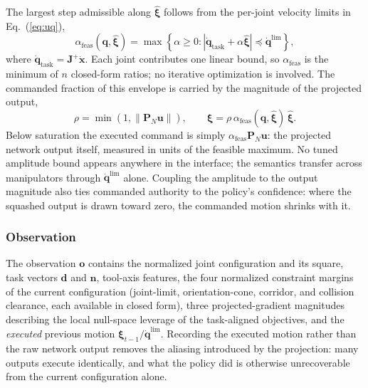 \documentclass[journal, twoside]{IEEEtran}
\begin{document}
The largest step admissible along $\hat{\boldsymbol{\xi}}$ follows from
the per-joint velocity limits in Eq.~(\ref{eq:uq}),
\begin{equation}
\label{eq:alphafeas}
\alpha_{\mathrm{feas}}(\mathbf{q},\hat{\boldsymbol{\xi}})
=
\max
\left\{
\alpha\geq 0:
\left|
\dot{\mathbf{q}}_{\mathrm{task}}+\alpha\hat{\boldsymbol{\xi}}
\right|
\preceq
\dot{\mathbf{q}}^{\lim}
\right\},
\end{equation}
where $\dot{\mathbf{q}}_{\mathrm{task}}=\mathbf{J}^{+}\dot{\mathbf{x}}$.
Each joint contributes one linear bound, so
$\alpha_{\mathrm{feas}}$ is the minimum of $n$ closed-form ratios; no
iterative optimization is involved. The commanded fraction of this
envelope is carried by the magnitude of the projected output,
\begin{equation}
\label{eq:rho}
\rho
=
\min\left(1,\left\|\mathbf{P}_{N}\mathbf{u}\right\|\right),
\qquad
\boldsymbol{\xi}
=
\rho\,
\alpha_{\mathrm{feas}}(\mathbf{q},\hat{\boldsymbol{\xi}})\,
\hat{\boldsymbol{\xi}}.
\end{equation}
Below saturation the executed command is simply
$\alpha_{\mathrm{feas}}\mathbf{P}_{N}\mathbf{u}$: the projected network
output itself, measured in units of the feasible maximum. No tuned
amplitude bound appears anywhere in the interface; the semantics transfer
across manipulators through $\dot{\mathbf{q}}^{\lim}$ alone. Coupling the
amplitude to the output magnitude also ties commanded authority to the
policy's confidence: where the squashed output is drawn toward zero, the
commanded motion shrinks with it.

\subsubsection{Observation}

The observation $\mathbf{o}$ contains the normalized joint configuration
and its square, task vectors $\mathbf{d}$ and $\mathbf{n}$, tool-axis
features, the four normalized constraint margins of the current
configuration (joint-limit, orientation-cone, corridor, and collision
clearance, each available in closed form), three projected-gradient
magnitudes describing the local null-space leverage of the task-aligned
objectives, and the \emph{executed} previous motion
$\boldsymbol{\xi}_{t-1}/\dot{\mathbf{q}}^{\lim}$. Recording the executed
motion rather than the raw network output removes the aliasing introduced
by the projection: many outputs execute identically, and what the policy
did is otherwise unrecoverable from the current configuration alone.
\end{document}
